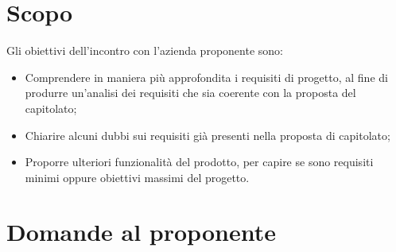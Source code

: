 \section{Scopo}\label{sec:scopo}
Gli obiettivi dell'incontro con l'azienda proponente sono:
\begin{itemize}
    \item Comprendere in maniera più approfondita i requisiti di progetto, al fine di produrre un'analisi dei requisiti che sia coerente con la proposta del capitolato;
    \item Chiarire alcuni dubbi sui requisiti già presenti nella proposta di capitolato;
    \item Proporre ulteriori funzionalità del prodotto, per capire se sono requisiti minimi oppure obiettivi massimi del progetto.
\end{itemize}
\section{Domande al proponente}\label{sec:domande}
